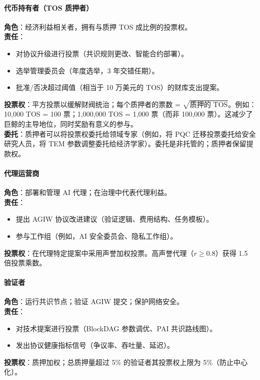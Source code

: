 \documentclass[11pt]{article}
\begin{document}
\paragraph{代币持有者（TOS 质押者）}
\textbf{角色}：经济利益相关者，拥有与质押 TOS 成比例的投票权。\\
\textbf{责任}：
\begin{itemize}[noitemsep]
  \item 对协议升级进行投票（共识规则更改、智能合约部署）。
  \item 选举管理委员会（年度选举，3 年交错任期）。
  \item 批准/否决超过阈值（相当于 10 万美元的 TOS）的财库支出提案。
\end{itemize}
\textbf{投票权}：平方投票以缓解财阀统治；每个质押者的票数 = $\sqrt{\text{质押的 TOS}}$。例如：10,000 TOS = 100 票；1,000,000 TOS = 1,000 票（而非 100,000 票）。这减少了巨鲸的主导地位，同时奖励有意义的参与。\\
\textbf{委托}：质押者可以将投票权委托给领域专家（例如，将 PQC 迁移投票委托给安全研究人员，将 TEM 参数调整委托给经济学家）。委托是非托管的；质押者保留提款权。

\paragraph{代理运营商}
\textbf{角色}：部署和管理 AI 代理；在治理中代表代理利益。\\
\textbf{责任}：
\begin{itemize}[noitemsep]
  \item 提出 AGIW 协议改进建议（验证逻辑、费用结构、任务模板）。
  \item 参与工作组（例如，AI 安全委员会、隐私工作组）。
\end{itemize}
\textbf{投票权}：在代理特定提案中采用声誉加权投票。高声誉代理（$r \geq 0.8$）获得 1.5 倍投票乘数。

\paragraph{验证者}
\textbf{角色}：运行共识节点；验证 AGIW 提交；保护网络安全。\\
\textbf{责任}：
\begin{itemize}[noitemsep]
  \item 对技术提案进行投票（BlockDAG 参数调优、PAI 共识路线图）。
  \item 发出协议健康指标信号（争议率、吞吐量、延迟）。
\end{itemize}
\textbf{投票权}：质押加权；总质押量超过 5\% 的验证者其投票权上限为 5\%（防止中心化）。
\end{document}
